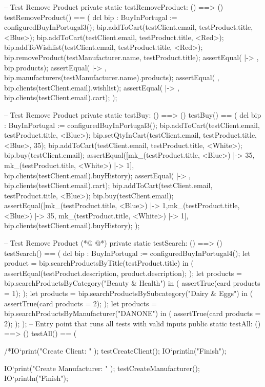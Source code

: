 \begin{vdmpp}[breaklines=true]
 -- Test Remove Product
 private static testRemoveProduct: () ==> ()
 testRemoveProduct() == (
  dcl bip : BuyInPortugal := configuredBuyInPortugal3();
  bip.addToCart(testClient.email, testProduct.title, <Blue>);
  bip.addToCart(testClient.email, testProduct.title, <Red>);
  bip.addToWishlist(testClient.email, testProduct.title, <Red>);
  bip.removeProduct(testManufacturer.name, testProduct.title);
  assertEqual({ |-> }, bip.products);
  assertEqual({ |-> }, bip.manufacturers(testManufacturer.name).products);
  assertEqual({ }, bip.clients(testClient.email).wishlist);
  assertEqual({ |-> }, bip.clients(testClient.email).cart);
 );
 
 -- Test Remove Product
 private static testBuy: () ==> ()
 testBuy() == (
  dcl bip : BuyInPortugal := configuredBuyInPortugal3();
  bip.addToCart(testClient.email, testProduct.title, <Blue>);
  bip.setQtyInCart(testClient.email, testProduct.title, <Blue>, 35);
  bip.addToCart(testClient.email, testProduct.title, <White>);
  bip.buy(testClient.email);
  assertEqual([{mk_(testProduct.title, <Blue>) |-> 35, mk_(testProduct.title, <White>) |-> 1}], bip.clients(testClient.email).buyHistory);
  assertEqual({ |-> }, bip.clients(testClient.email).cart);
  bip.addToCart(testClient.email, testProduct.title, <Blue>);
  bip.buy(testClient.email);
  assertEqual([{mk_(testProduct.title, <Blue>) |-> 1},{mk_(testProduct.title, <Blue>) |-> 35, mk_(testProduct.title, <White>) |-> 1}], bip.clients(testClient.email).buyHistory);
 );
 
 
 -- Test Remove Product
(*@
\label{testSearch:422}
@*)
 private static testSearch: () ==> ()
 testSearch() == (
  dcl bip : BuyInPortugal := configuredBuyInPortugal4();
  let product = bip.searchProductsByTitle(testProduct.title)
  in (
   assertEqual(testProduct.description, product.description);
  );
  let products = bip.searchProductsByCategory("Beauty & Health")
  in (
   assertTrue(card products = 1);
  );
  let products = bip.searchProductsBySubcategory("Dairy & Eggs")
  in (
   assertTrue(card products = 2);
  );
  let products = bip.searchProductsByManufacturer("DANONE")
  in (
   assertTrue(card products = 2);
  );
 );
 -- Entry point that runs all tests with valid inputs
 public static testAll: () ==> ()
 testAll() ==
 (

   /*IO`print("Create Client: " );
    testCreateClient();
    IO`println("Finish");
   
    IO`print("Create Manufacturer: " );
    testCreateManufacturer();
    IO`println("Finish");
    

\end{vdmpp}
